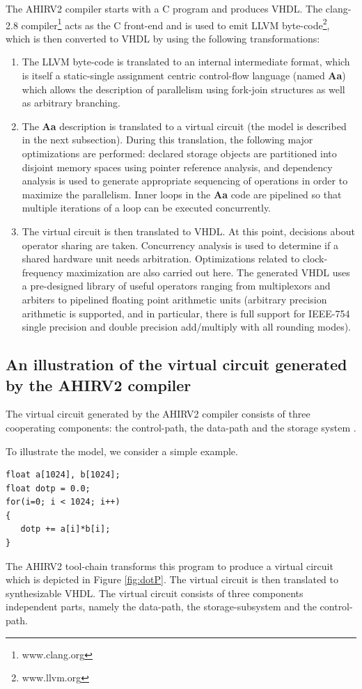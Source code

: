 \documentclass[conference]{IEEEtran}
\begin{document}
The AHIRV2 compiler starts with a C program and produces VHDL.  %
The clang-2.8 compiler\footnote{www.clang.org} %
acts as the C front-end
and is used to emit LLVM byte-code\footnote{www.llvm.org}, 
which is then converted to VHDL by using the following transformations:
\begin{enumerate}
\item The LLVM byte-code is translated to an internal intermediate
format, which is itself a static-single assignment centric 
control-flow language (named {\bf Aa}) which allows the description of parallelism
using fork-join structures as well as arbitrary branching.
\item The {\bf Aa} description is translated to a virtual circuit (the model
is described in the next subsection).  During this translation, the
following major optimizations
are performed:  declared storage objects are partitioned into disjoint memory
spaces using pointer reference analysis, and dependency analysis is used to
generate appropriate sequencing of operations in order to maximize the 
parallelism.  Inner loops in the {\bf Aa} code are pipelined so that
multiple iterations of a loop can be executed concurrently.  
\item The virtual circuit is then translated to VHDL.  At this point,
decisions about operator sharing are taken.  Concurrency analysis is
used to determine if a shared hardware unit needs arbitration. Optimizations
related to clock-frequency maximization are also carried out here.
The generated VHDL uses a pre-designed library of useful operators ranging from
multiplexors and arbiters to pipelined floating point arithmetic units (arbitrary
precision arithmetic is supported, and in particular, there is
full support for IEEE-754 single precision and double precision add/multiply with
all rounding modes).
\end{enumerate}


\subsection{An illustration of the virtual circuit generated by the AHIRV2 compiler}

The virtual circuit generated by the AHIRV2 compiler consists of three
cooperating components: the control-path, the data-path and
the storage system \cite{c:ahir_dsd2010,c:ahir_usenix2012}.

To illustrate the model, we consider a simple example.
\begin{verbatim}
float a[1024], b[1024];
float dotp = 0.0;
for(i=0; i < 1024; i++)
{
   dotp += a[i]*b[i];
}
\end{verbatim}
The AHIRV2 tool-chain transforms this program to 
produce a virtual circuit which is depicted in Figure \ref{fig:dotP}. The
virtual circuit is then translated to synthesizable VHDL.
The virtual circuit consists of three components independent parts, namely
the data-path, the storage-subsystem and the control-path.
\end{document}
